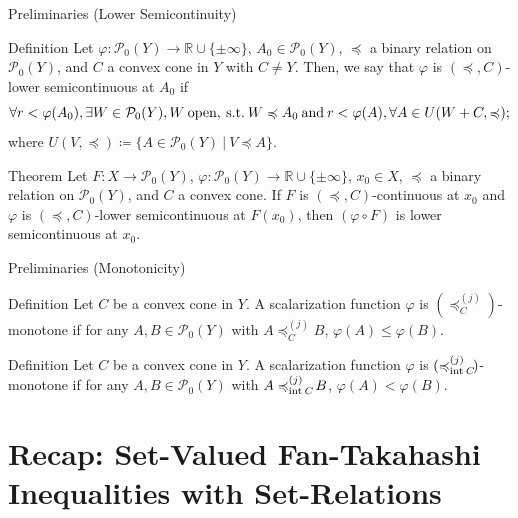 \documentclass[aspectratio=169, dvipdfmx, 11pt]{beamer}
\newcommand{\RealNumberSet}{\mathbb{R}}
\newcommand{\Interior}[1]{\text{\rm int\:${#1}$}} %
\newcommand{\pow}[1]{\mathcal{P}_{0}(#1)}
\newcommand{\SuchThat}{\:\text{s.t.}\:}
\newcommand{\SetForm}[2]{
  \{{#1}\:|\:{#2}\}
}
\newcommand{\setrel}[2]{\preccurlyeq^{(#1)}_{#2}\!}
\begin{document}
\begin{frame}{Preliminaries (Lower Semicontinuity)}
  \begin{block}{Definition \cite{500001551932}}
    Let $\varphi \colon \pow{Y} \to \RealNumberSet \cup \{\pm \infty\}$, $A_0 \in \pow{Y}$,
    $\preccurlyeq$ a binary relation on $\pow{Y}$, and $C$ a convex cone in $Y$ with $C \ne Y$. Then,
    we say that $\varphi$ is $(\preccurlyeq, C)$-lower semicontinuous at $A_0$ if
    \begin{equation}
      \forall r < \varphi (A_0), \exists W \in \pow{Y}, W\:\text{open}, \SuchThat W \preccurlyeq A_0 \:\text{and}\:
      r < \varphi (A), \forall A \in U(W + C, \preccurlyeq); \notag
    \end{equation}
    where $U(V,\preccurlyeq) \coloneqq \SetForm{A \in \pow{Y}}{V \preccurlyeq A}$.
  \end{block}

  \begin{block}{Theorem \cite{500001551932}}
    Let $F \colon X \to \pow{Y}$, $\varphi \colon \pow{Y} \to \RealNumberSet \cup \{\pm \infty\}$, $x_0 \in X$,
    $\preccurlyeq$ a binary relation on $\pow{Y}$, and $C$ a convex cone. If $F$ is $(\preccurlyeq, C)$-continuous at $x_0$
    and $\varphi$ is $(\preccurlyeq, C)$-lower semicontinuous at $F(x_0)$, then $(\varphi \circ F)$ is lower semicontinuous at $x_0$.
  \end{block}
\end{frame}

\begin{frame}{Preliminaries (Monotonicity)}
  \begin{block}{Definition}
    Let $C$ be a convex cone in $Y$.
    A scalarization function $\varphi$ is $(\setrel{j}{C})$-monotone if
    for any $A, B \in \pow{Y}$ with
    $A \setrel{j}{C} B$, $\varphi (A) \leq \varphi (B)$.
  \end{block}

  \begin{block}{Definition}
    Let $C$ be a convex cone in $Y$.
    A scalarization function $\varphi$ is $(\setrel{j}{\Interior{C}})$-monotone if
    for any $A, B \in \pow{Y}$ with
    $A \setrel{j}{\Interior{C}} B$, $\varphi (A) < \varphi (B)$.
  \end{block}
\end{frame}

\section{Recap: Set-Valued Fan-Takahashi Inequalities with Set-Relations}
\end{document}

